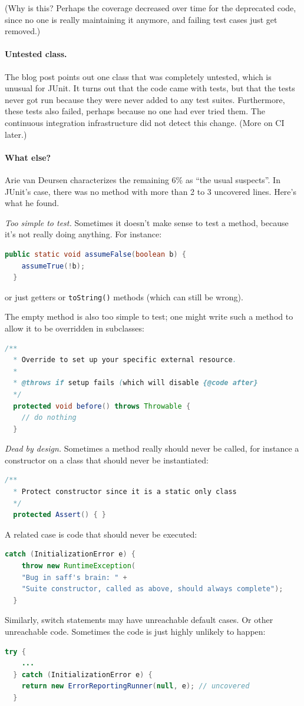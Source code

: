 \documentclass[11pt]{article}
\begin{document}
(Why is this? Perhaps the coverage decreased over time for the deprecated code, since
no one is really maintaining it anymore, and failing test cases just get removed.)

\paragraph{Untested class.} The blog post points out one class that was completely
untested, which is unusual for JUnit. It turns out that the code came with tests,
but that the tests never got run because they were never added to any test suites.
Furthermore, these tests also failed, perhaps because no one had ever tried them.
The continuous integration infrastructure did not detect this change. (More on CI
later.)

\paragraph{What else?} Arie van Deursen characterizes the remaining 6\% as
``the usual suspects''. In JUnit's case, there was no method with more than
2 to 3 uncovered lines. Here's what he found.

\noindent
\emph{Too simple to test.} Sometimes it doesn't make sense to test a method, because
it's not really doing anything. For instance:
\begin{lstlisting}[language=Java]
  public static void assumeFalse(boolean b) {
    assumeTrue(!b);
  }
\end{lstlisting}
or just getters or {\tt toString()} methods (which can still be wrong).

The empty method is also too simple to test; one might write such a method to allow
it to be overridden in subclasses:
\begin{lstlisting}[language=Java]
  /**
  * Override to set up your specific external resource.
  *
  * @throws if setup fails (which will disable {@code after}
  */
  protected void before() throws Throwable {
    // do nothing
  }
\end{lstlisting}

\noindent \emph{Dead by design.} Sometimes a method really should never be called,
for instance a constructor on a class that should never be instantiated:
\begin{lstlisting}[language=Java]
  /**
  * Protect constructor since it is a static only class
  */
  protected Assert() { }
\end{lstlisting}

A related case is code that should never be executed:
\begin{lstlisting}[language=Java]
  catch (InitializationError e) {
    throw new RuntimeException(
    "Bug in saff's brain: " +
    "Suite constructor, called as above, should always complete");
  }
\end{lstlisting}
Similarly, switch statements may have unreachable default cases. Or other unreachable code.
Sometimes the code is just highly unlikely to happen:
\begin{lstlisting}[language=Java]
  try {
    ...
  } catch (InitializationError e) {
    return new ErrorReportingRunner(null, e); // uncovered
  }
\end{lstlisting}
\end{document}
